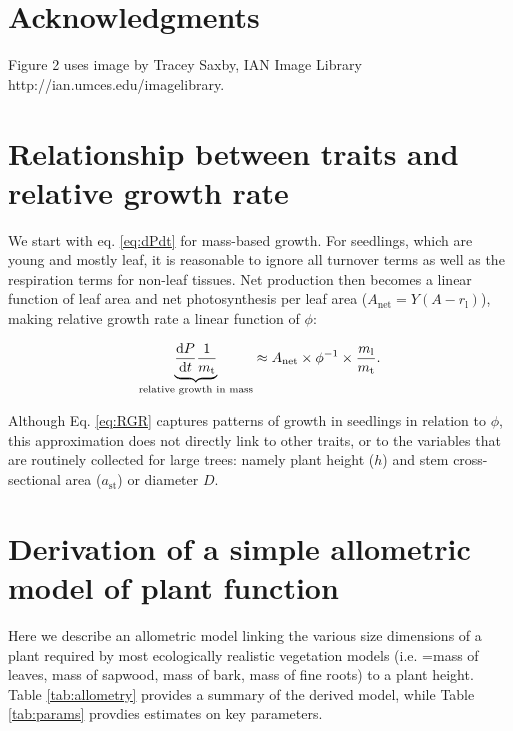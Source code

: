 \documentclass[12pt, a4paper]{article}
\begin{document}
\section{Acknowledgments}

Figure 2 uses image by Tracey Saxby, IAN Image Library http://ian.umces.edu/imagelibrary.

\newpage



\newpage
\begin{appendices}
\setcounter{figure}{0} \renewcommand{\thefigure}{S\arabic{figure}}
\setcounter{table}{0} \renewcommand{\thetable}{S\arabic{table}}


\section{Relationship between traits and relative growth rate} \label{app:traits-RGR}

We start with eq. \ref{eq:dPdt} for mass-based growth. For seedlings, which are
young and mostly leaf, it is reasonable to ignore all turnover terms as
well as the respiration terms for non-leaf tissues. Net production then
becomes a linear function of leaf area and net photosynthesis per leaf
area ($A_\textrm{net} = Y(A - r_\textrm{l})$), making relative growth
rate a linear function of $\phi$:

\begin{equation}\label{eq:RGR}
\underbrace{\strut\frac{\textrm{d}P}{\textrm{d}t}\frac{1}{m_\textrm{t}}}_\textrm{relative growth in mass}  \approx A_\textrm{net} \times \phi^{-1} \times \frac{m_\textrm{l}}{m_\textrm{t}}. \end{equation}

Although Eq. \ref{eq:RGR} captures patterns of growth in seedlings in
relation to $\phi$\citep{wright_cross-2000}, this
approximation does not directly link to other traits, or to the
variables that are routinely collected for large trees: namely plant
height ($h$) and stem cross-sectional area ($a_\textrm{st}$) or
diameter $D$.


\section{Derivation of a simple allometric model of plant
function}\label{app:func_balance}

Here we describe an allometric model linking the various size dimensions
of a plant required by most ecologically realistic vegetation models
(i.e. =mass of leaves, mass of sapwood, mass of bark, mass of fine
roots) to a plant height. Table \ref{tab:allometry} provides a summary
of the derived model, while Table \ref{tab:params} provdies estimates on
key parameters.



\end{appendices}
\end{document}
